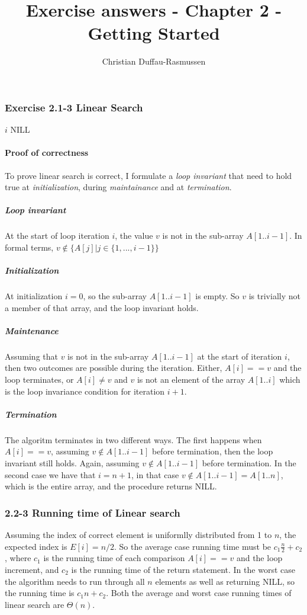 \documentclass{article}
\title{Exercise answers - Chapter 2 - Getting Started}
\author{Christian Duffau-Rasmussen}
\let\oldReturn\Return
\renewcommand{\Return}{\State\oldReturn}
\begin{document}
\maketitle

\subsubsection*{Exercise 2.1-3 Linear Search}

\begin{algorithmic}[1]
		\Return $i$
	\EndIf
\EndFor
\Return NILL
\EndProcedure
\end{algorithmic}

\paragraph{Proof of correctness}

To prove linear search is correct, I formulate a \emph{loop invariant} that need to hold true at \emph{initialization}, during \emph{maintainance} and at \emph{termination}.

\subparagraph{Loop invariant} At the start of loop iteration $i$, the value $v$ is not in the sub-array $A[1..i-1]$. In formal terms, $v \notin \{ A[j] \vert j\in\{1,...,i-1\} \}$

\subparagraph{Initialization} At initialization $i=0$, so the sub-array $A[1..i-1]$ is empty. So $v$ is trivially not a member of that array, and the loop invariant holds.

\subparagraph{Maintenance} Assuming that $v$ is not in the sub-array $A[1..i-1]$ at the start of iteration $i$, then two outcomes are possible during the iteration. Either, $A[i] == v$ and the loop terminates, or $A[i]\neq v$ and $v$ is not an element of the array $A[1..i]$ which is the loop invariance condition for iteration $i+1$.

\subparagraph{Termination} The algoritm terminates in two different ways. The first happens when $A[i] == v$, assuming $v \notin A[1..i-1]$ before termination, then the loop invariant still holds. Again, assuming $v \notin A[1..i-1]$ before termination. In the second case we have that $i=n+1$, in that case $v \notin A[1..i-1]=A[1..n]$, which is the entire array, and the procedure returns NILL.

\subsubsection*{2.2-3 Running time of Linear search}
Assuming the index of correct element is uniformlly distributed from 1 to $n$, the expected index is $E[i] = n/2$. So the average case running time must be $c_1\frac{n}{2} + c_2$, where $c_1$ is the running time of each comparison $A[i]==v$ and the loop increment,  and $c_2$ is the running time of the return statement. In the worst case the algorithm needs to run through all $n$ elements as well as returning NILL, so the running time is $c_1n + c_2$.  
Both the average and worst case running times of linear search are $\Theta(n)$.
\end{document}

